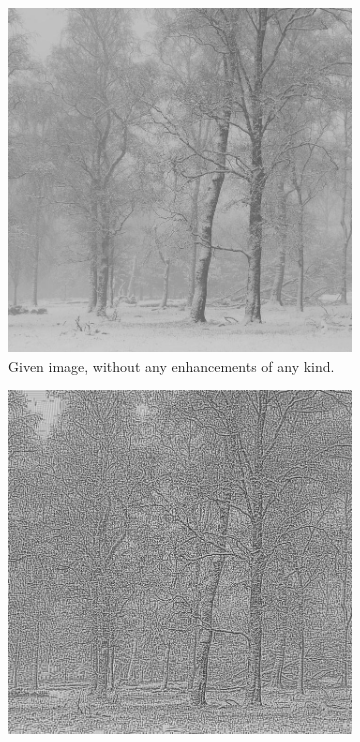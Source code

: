 \documentclass[a4paper, landscape]{article}
\begin{document}
\begin{figure}
    \centering
    \begin{subfigure}{0.32\linewidth}
        \centering
        \includegraphics[width=0.9\linewidth]{LC2.jpg}
        \caption{Given image, without any enhancements of any kind.}
        \label{lc2_orig}
    \end{subfigure}
    \begin{subfigure}{0.32\linewidth}
        \centering
        \includegraphics[width=0.9\linewidth]{smol_enhanced_LC2.png}

\end{subfigure}
\end{figure}
\end{document}

